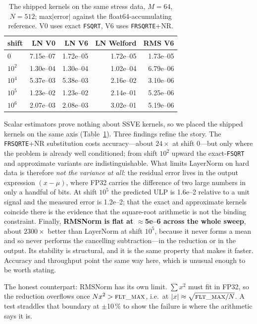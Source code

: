 \documentclass[conference,10pt]{IEEEtran}
\newcommand{\code}[1]{\texttt{\small #1}}
\begin{document}
\begin{table}[t]
\caption{The shipped kernels on the same stress data, $M=64$, $N=512$;
max$|$error$|$ against the float64-accumulating reference. V0 uses exact
\code{FSQRT}, V6 uses \code{FRSQRTE}+NR.}
\label{tab:kernelacc}
\centering
\small
\begin{tabular}{lrrrr}
\toprule
shift & LN V0 & LN V6 & LN Welford & RMS V6 \\
\midrule
$0$      & 7.15e--07 & 1.72e--05 & 1.72e--05 & 1.73e--05 \\
$10^{2}$ & 1.30e--04 & 1.30e--04 & 1.02e--04 & 6.79e--06 \\
$10^{4}$ & 5.37e--03 & 5.38e--03 & 2.16e--02 & 3.10e--06 \\
$10^{5}$ & 1.23e--02 & 1.23e--02 & 2.14e--01 & 5.25e--06 \\
$10^{6}$ & 2.07e--03 & 2.08e--03 & 3.02e--01 & 5.19e--06 \\
\bottomrule
\end{tabular}
\end{table}

Scalar estimators prove nothing about SSVE kernels, so we placed the shipped
kernels on the same axis (Table~\ref{tab:kernelacc}). Three findings refine the
story. The
\code{FRSQRTE}+NR substitution costs accuracy---about $24\times$ at shift
0---but only where the problem is already well conditioned; from shift $10^2$
upward the exact-\code{FSQRT} and approximate variants are indistinguishable.
What limits LayerNorm on hard data is therefore \emph{not the variance at all}:
the residual error lives in the output expression $(x-\mu)$, where FP32 carries
the difference of two large numbers in only a handful of bits. At shift $10^5$
the predicted ULP is 1.6e--2 relative to a unit signal and the measured error is
1.2e--2; that the exact and approximate kernels coincide there is the evidence
that the square-root arithmetic is not the binding constraint. Finally,
\textbf{RMSNorm is flat at $\approx$5e--6 across the whole sweep}, about
$2300\times$ better than LayerNorm at shift $10^5$, because it never forms a
mean and so never performs the cancelling subtraction---in the reduction or in
the output. Its stability is structural, and it is the same property that makes
it faster. Accuracy and throughput point the same way here, which is unusual
enough to be worth stating.

The honest counterpart: RMSNorm has its own limit. $\sum x^2$ must fit in FP32,
so the reduction overflows once $N x^2 > \textsc{flt\_max}$, i.e.\ at
$|x|\approx\sqrt{\textsc{flt\_max}/N}$. A test straddles that boundary at
$\pm$10\,\% to show the failure is where the arithmetic says it is.
\end{document}
